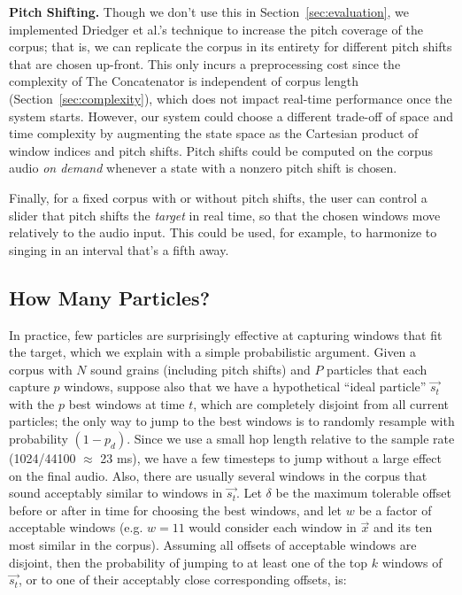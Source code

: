 \documentclass{article}
\begin{document}
\textbf{Pitch Shifting.} Though we don't use this in Section~\ref{sec:evaluation}, we implemented Driedger et al.'s technique to increase the pitch coverage of the corpus; that is, we can replicate the corpus in its entirety for different pitch shifts that are chosen up-front.  This only incurs a preprocessing cost since the complexity of The Concatenator is independent of corpus length (Section~\ref{sec:complexity}), which does not impact real-time performance once the system starts.  However, our system could choose a different trade-off of space and time complexity by augmenting the state space as the Cartesian product of window indices and pitch shifts.  Pitch shifts could be computed on the corpus audio {\em on demand} whenever a state with a nonzero pitch shift is chosen.

Finally, for a fixed corpus with or without pitch shifts, the user can control a slider that pitch shifts the {\em target} in real time, so that the chosen windows move relatively to the audio input.  This could be used, for example, to harmonize to singing in an interval that's a fifth away.

\subsection{How Many Particles?}
\label{sec:howmanyparticles}
In practice, few particles are surprisingly effective at capturing windows that fit the target, which we explain with a simple probabilistic argument.  Given a corpus with $N$ sound grains (including pitch shifts) and $P$ particles that each capture $p$ windows, suppose also that we have a hypothetical ``ideal particle'' $\vec{s_t}$ with the $p$ best windows at time $t$, which are completely disjoint from all current particles; the only way to jump to the best windows is to randomly resample with probability $(1-p_d)$.  Since we use a small hop length relative to the sample rate (1024/44100 $\approx$ 23 ms), we have a few timesteps to jump without a large effect on the final audio.  Also, there are usually several windows in the corpus that sound acceptably similar to windows in $\vec{s_t}$.  Let $\delta$ be the maximum tolerable offset before or after in time for choosing the best windows, and let $w$ be a factor of acceptable windows (e.g. $w=11$ would consider each window in $\vec{x}$ and its ten most similar in the corpus).  Assuming all offsets of acceptable windows are disjoint, then the probability of jumping to at least one of the top $k$ windows of $\vec{s_{t}}$, or to one of their acceptably close corresponding offsets, is:
\end{document}
